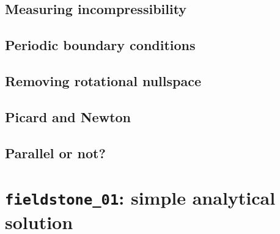 \documentclass[a4paper]{article}
\begin{document}
\subsection{Measuring incompressibility \label{ss_incomp}}  %
\newpage %
\subsection{Periodic boundary conditions\label{ss_periodic}} %
\newpage %
\subsection{Removing rotational nullspace\label{ss_nullspace}} 
\newpage %
\subsection{Picard and Newton \label{ss_nonlinear}}  %
\newpage %
\subsection{Parallel or not?} \label{sec:parallel} 









\newpage %
\section{{\tt fieldstone\_01}: simple analytical solution \label{f01}} %
\end{document}
